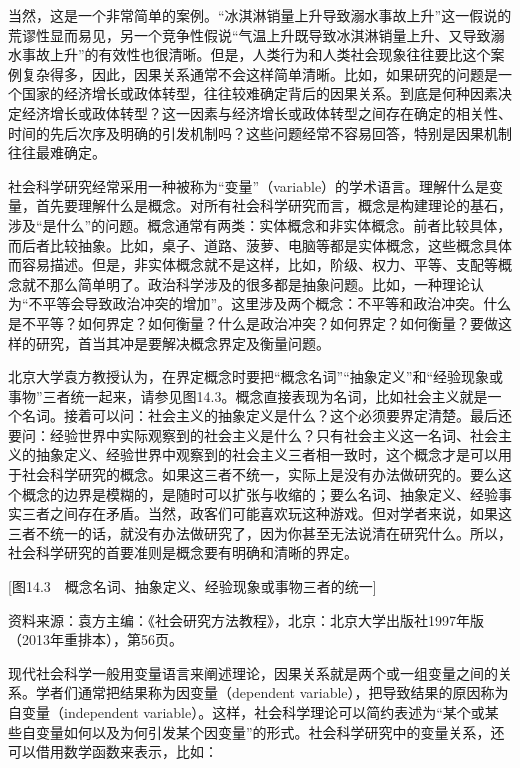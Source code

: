 当然，这是一个非常简单的案例。“冰淇淋销量上升导致溺水事故上升”这一假说的荒谬性显而易见，另一个竞争性假说“气温上升既导致冰淇淋销量上升、又导致溺水事故上升”的有效性也很清晰。但是，人类行为和人类社会现象往往要比这个案例复杂得多，因此，因果关系通常不会这样简单清晰。比如，如果研究的问题是一个国家的经济增长或政体转型，往往较难确定背后的因果关系。到底是何种因素决定经济增长或政体转型？这一因素与经济增长或政体转型之间存在确定的相关性、时间的先后次序及明确的引发机制吗？这些问题经常不容易回答，特别是因果机制往往最难确定。


社会科学研究经常采用一种被称为“变量”（variable）的学术语言。理解什么是变量，首先要理解什么是概念。对所有社会科学研究而言，概念是构建理论的基石，涉及“是什么”的问题。概念通常有两类：实体概念和非实体概念。前者比较具体，而后者比较抽象。比如，桌子、道路、菠萝、电脑等都是实体概念，这些概念具体而容易描述。但是，非实体概念就不是这样，比如，阶级、权力、平等、支配等概念就不那么简单明了。政治科学涉及的很多都是抽象问题。比如，一种理论认为“不平等会导致政治冲突的增加”。这里涉及两个概念：不平等和政治冲突。什么是不平等？如何界定？如何衡量？什么是政治冲突？如何界定？如何衡量？要做这样的研究，首当其冲是要解决概念界定及衡量问题。

北京大学袁方教授认为，在界定概念时要把“概念名词”“抽象定义”和“经验现象或事物”三者统一起来，请参见图14.3。概念直接表现为名词，比如社会主义就是一个名词。接着可以问：社会主义的抽象定义是什么？这个必须要界定清楚。最后还要问：经验世界中实际观察到的社会主义是什么？只有社会主义这一名词、社会主义的抽象定义、经验世界中观察到的社会主义三者相一致时，这个概念才是可以用于社会科学研究的概念。如果这三者不统一，实际上是没有办法做研究的。要么这个概念的边界是模糊的，是随时可以扩张与收缩的；要么名词、抽象定义、经验事实三者之间存在矛盾。当然，政客们可能喜欢玩这种游戏。但对学者来说，如果这三者不统一的话，就没有办法做研究了，因为你甚至无法说清在研究什么。所以，社会科学研究的首要准则是概念要有明确和清晰的界定。

[图14.3　概念名词、抽象定义、经验现象或事物三者的统一]

资料来源：袁方主编：《社会研究方法教程》，北京：北京大学出版社1997年版（2013年重排本），第56页。

现代社会科学一般用变量语言来阐述理论，因果关系就是两个或一组变量之间的关系。学者们通常把结果称为因变量（dependent variable），把导致结果的原因称为自变量（independent variable）。这样，社会科学理论可以简约表述为“某个或某些自变量如何以及为何引发某个因变量”的形式。社会科学研究中的变量关系，还可以借用数学函数来表示，比如：

